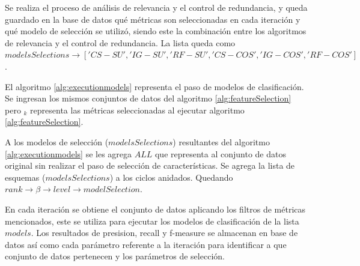 Se realiza el proceso de análisis de relevancia y el control de redundancia, y queda guardado en la base de datos qué métricas son seleccionadas en cada iteración y qué modelo de selección se utilizó, siendo este la combinación entre los algoritmos de relevancia y el control de redundancia. La lista queda como \(modelsSelections \rightarrow ['CS-SU','IG-SU','RF-SU','CS-COS','IG-COS','RF-COS']\).

 

El algoritmo \ref{alg:executionmodels} representa el paso de modelos de clasificación. Se ingresan los mismos conjuntos de datos del algoritmo \ref{alg:featureSelection} pero $_{k}$ representa las métricas seleccionadas al ejecutar algoritmo \ref{alg:featureSelection}.

A los modelos de selección (\(modelsSelections\)) resultantes del algoritmo \ref{alg:executionmodels} se les agrega \(ALL\) que representa al conjunto de datos original sin realizar el paso de selección de características. Se agrega la lista de esquemas (\(modelsSelections\)) a los ciclos anidados. Quedando \(rank \rightarrow \beta \rightarrow level \rightarrow modelSelection\).



En cada iteración se obtiene el conjunto de datos aplicando los filtros de métricas mencionados, este se utiliza para ejecutar los modelos de clasificación de la lista $models$. Los resultados de presision, recall y f-measure se almacenan en base de datos así como cada parámetro referente a la iteración para identificar a que conjunto de datos pertenecen y los parámetros de selección.



